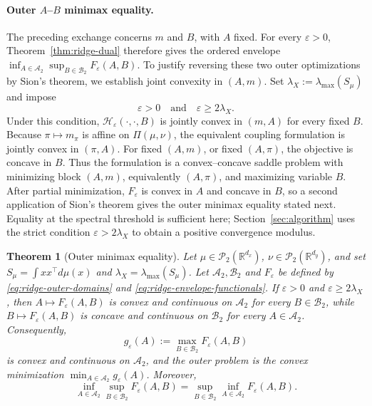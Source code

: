 \documentclass[11pt]{article}
\newcommand{\R}{\mathbb R}
\newcommand{\cP}{\mathcal P}
\theoremstyle{plain}
\newtheorem{theorem}{Theorem}[section]
\theoremstyle{definition}
\theoremstyle{remark}
\begin{document}
\paragraph{Outer \(A\)--\(B\) minimax equality.}
The preceding exchange concerns \(m\) and \(B\), with \(A\) fixed. For every
\(\varepsilon>0\), Theorem~\ref{thm:ridge-dual} therefore gives the ordered
envelope \(\inf_{A\in\mathcal A_2}\sup_{B\in\mathcal B_2}
F_\varepsilon(A,B)\). To justify reversing these two outer optimizations by
Sion's theorem, we establish joint convexity in \((A,m)\). Set
\(\lambda_X:=\lambda_{\max}(S_\mu)\) and impose
\[
 \varepsilon>0
 \quad\text{and}\quad
 \varepsilon\ge 2\lambda_X.
\]
Under this condition, \(\mathcal H_\varepsilon(\cdot,\cdot,B)\) is jointly
convex in \((m,A)\) for every fixed \(B\). Because
\(\pi\mapsto m_\pi\) is affine on \(\Pi(\mu,\nu)\), the equivalent coupling
formulation is jointly convex in \((\pi,A)\). For fixed \((A,m)\), or fixed
\((A,\pi)\), the objective is concave in \(B\). Thus the formulation is a
convex--concave saddle problem with minimizing block \((A,m)\), equivalently
\((A,\pi)\), and maximizing variable \(B\). After partial minimization,
\(F_\varepsilon\) is convex in \(A\) and concave in \(B\), so a second
application of Sion's theorem gives the outer minimax equality stated next.
Equality at the spectral threshold is sufficient here;
Section~\ref{sec:algorithm} uses the strict condition
\(\varepsilon>2\lambda_X\) to obtain a positive convergence modulus.

\begin{theorem}[Outer minimax equality]\label{thm:swap}
Let \(\mu\in\cP_2(\R^{d_x})\), \(\nu\in\cP_2(\R^{d_y})\), and set
\(S_\mu=\int xx^\top d\mu(x)\) and
\(\lambda_X=\lambda_{\max}(S_\mu)\). Let \(\mathcal A_2,\mathcal B_2\) and
\(F_\varepsilon\) be defined by
\eqref{eq:ridge-outer-domains} and \eqref{eq:ridge-envelope-functionals}.
If \(\varepsilon>0\) and \(\varepsilon\ge2\lambda_X\), then
\(A\mapsto F_\varepsilon(A,B)\) is convex and continuous on
\(\mathcal A_2\) for every \(B\in\mathcal B_2\), while
\(B\mapsto F_\varepsilon(A,B)\) is concave and continuous on
\(\mathcal B_2\) for every \(A\in\mathcal A_2\). Consequently,
\[
 g_\varepsilon(A):=\max_{B\in\mathcal B_2}F_\varepsilon(A,B)
\]
is convex and continuous on \(\mathcal A_2\), and the outer problem is the
convex minimization \(\min_{A\in\mathcal A_2}g_\varepsilon(A)\). Moreover,
\[
 \inf_{A\in\mathcal A_2}\sup_{B\in\mathcal B_2}F_\varepsilon(A,B)
 =\sup_{B\in\mathcal B_2}\inf_{A\in\mathcal A_2}F_\varepsilon(A,B).
\]
\end{theorem}
\end{document}
